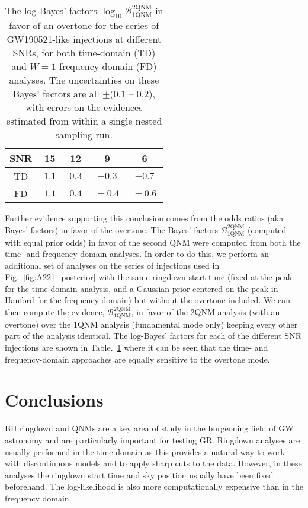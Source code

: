 \begin{table}[h]
	\centering
	\begin{tabular}{c|cccc}
		SNR & 15   & 12   & 9   & 6   \\ \hline
		TD & $~ 1.1 ~$ & $0.3$ & $-0.3$ & $-0.7$ \\
		FD & $~ 1.1 ~$ & $~ 0.4 ~$ & $~ -0.4 ~ $ & $~ -0.6 ~$   
	\end{tabular}
	\caption[The log-Bayes' factors in favor of an overtone for the series of GW190521-like injections at different SNRs, for both time-domain and $W=1$ frequency-domain analyses]{ 
		The log-Bayes' factors $\log_{10}\mathcal{B}^{2\mathrm{QNM}}_{1\mathrm{QNM}}$ in favor of an overtone for the series of GW190521-like injections at different SNRs, for both time-domain (TD) and $W=1$ frequency-domain (FD) analyses. 
		The uncertainties on these Bayes' factors are all $\pm (0.1$ -- $0.2)$, with errors on the evidences estimated from within a single nested sampling run.
	}
	\label{tab:bayes_factors}
\end{table}

Further evidence supporting this conclusion comes from the odds ratios (aka Bayes' factors) in favor of the overtone.
The Bayes' factors $\mathcal{B}^{2\mathrm{QNM}}_{1\mathrm{QNM}}$ (computed with equal prior odds) in favor of the second QNM were computed from both the time- and frequency-domain analyses. 
In order to do this, we perform an additional set of analyses on the series of injections used in Fig.~\ref{fig:A221_posterior} with the same ringdown start time (fixed at the peak for the time-domain analysis, and a Gaussian prior centered on the peak in Hanford for the frequency-domain) but without the overtone included.
We can then compute the evidence, $\mathcal{B}_{1\mathrm{QNM}}^{2\mathrm{QNM}}$, in favor of the 2QNM analysis (with an overtone) over the 1QNM analysis (fundamental mode only) keeping every other part of the analysis identical. 
The log-Bayes' factors for each of the different SNR injections are shown in Table.~\ref{tab:bayes_factors} where it can be seen that the time- and frequency-domain approaches are equally sensitive to the overtone mode.


\section{Conclusions}\label{ch3:sec:discussion}

BH ringdown and QNMs are a key area of study in the burgeoning field of GW astronomy and are particularly important for testing GR.
Ringdown analyses are usually performed in the time domain as this provides a natural way to work with discontinuous models and to apply sharp cuts to the data. 
However, in these analyses the ringdown start time and sky position usually have been fixed beforehand.
The log-likelihood is also more computationally expensive than in the frequency domain.

